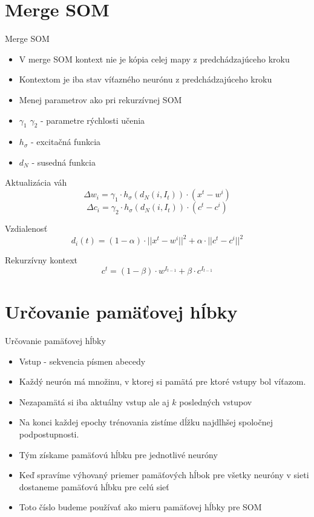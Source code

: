 \documentclass[10pt]{beamer}
\begin{document}
\section{Merge SOM}

\begin{frame}[fragile]{Merge SOM}

\begin{itemize}
\item V merge SOM kontext nie je kópia celej mapy z predchádzajúceho kroku
\item Kontextom je iba stav víťazného neurónu z predchádzajúceho kroku
\item Menej parametrov ako pri rekurzívnej SOM
\item $\gamma_1$ $\gamma_2$ - parametre rýchlosti učenia
\item $h_{\sigma}$ - excitačná funkcia
\item $d_N$ - susedná funkcia
\end{itemize}
Aktualizácia váh
\begin{equation*}
\Delta w_i = \gamma_{1} \cdot h_{\sigma}(d_{N}(i, I_{t})) \cdot (x^t - w^i)
\end{equation*}
\begin{equation*}
\Delta c_i = \gamma_{2} \cdot h_{\sigma}(d_{N}(i, I_{t})) \cdot (c^t - c^i)
\end{equation*}

Vzdialenosť
\begin{equation*}
d_i(t) = (1-\alpha) \cdot ||x^t - w^i||^2 + \alpha \cdot ||c^t - c^i||^2
\end{equation*}

Rekurzívny kontext
\begin{equation*}
c^t = (1 - \beta) \cdot w^{I_{t-1}} + \beta \cdot c^{I_{t-1}}
\end{equation*}
\end{frame}

\section{Určovanie pamäťovej hĺbky}
\begin{frame}[fragile]{Určovanie pamäťovej hĺbky}

\begin{itemize}
\item Vstup - sekvencia písmen abecedy
\item Každý neurón má množinu, v ktorej si pamätá pre ktoré vstupy bol víťazom.
\item Nezapamätá si iba aktuálny vstup ale aj $k$ posledných vstupov
\item Na konci každej epochy trénovania zistíme dĺžku najdlhšej spoločnej podpostupnosti.
\item Tým získame pamäťovú hĺbku pre jednotlivé neuróny
\item Keď spravíme výhovaný priemer pamäťových hĺbok pre všetky neuróny v sieti dostaneme pamäťovú hĺbku pre celú sieť
\item Toto číslo budeme používať ako mieru pamäťovej hĺbky pre SOM
\end{itemize}

\end{frame}
\end{document}
